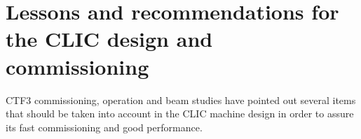 \chapter{Lessons and recommendations for the CLIC design and commissioning}
\label{chap.Recomendations}

CTF3 commissioning, operation and beam studies have pointed out
several items that should be taken into account in the CLIC 
machine design in order to assure its fast commissioning and good performance.






